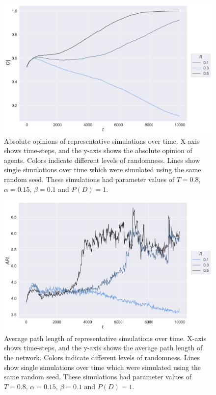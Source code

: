 \documentclass{article}
\begin{document}
\begin{figure}[H]
    \centering
    \includegraphics[width=.8\linewidth]{../plots/example/Example_Absolute_Opinion.png}
  \caption{Absolute opinions of representative simulations over time. X-axis shows time-steps, and the y-axis shows the absolute opinion of agents. Colors indicate different levels of randomness. Lines show single simulations over time which were simulated using the same random seed. These simulations had parameter values of $T = 0.8$, $\alpha = 0.15$, $\beta = 0.1$ and $P(D)=1$.}
  \label{fig:example_abs_opinion}
\end{figure}

\begin{figure}[H]
    \centering
    \includegraphics[width=.8\linewidth]{../plots/example/Example_Average_Path_Length.png}
  \caption{Average path length of representative simulations over time. X-axis shows time-steps, and the y-axis shows the average path length of the network. Colors indicate different levels of randomness. Lines show single simulations over time which were simulated using the same random seed. These simulations had parameter values of $T = 0.8$, $\alpha = 0.15$, $\beta = 0.1$ and $P(D)=1$.}
  \label{fig:example_path}
\end{figure}
\end{document}
